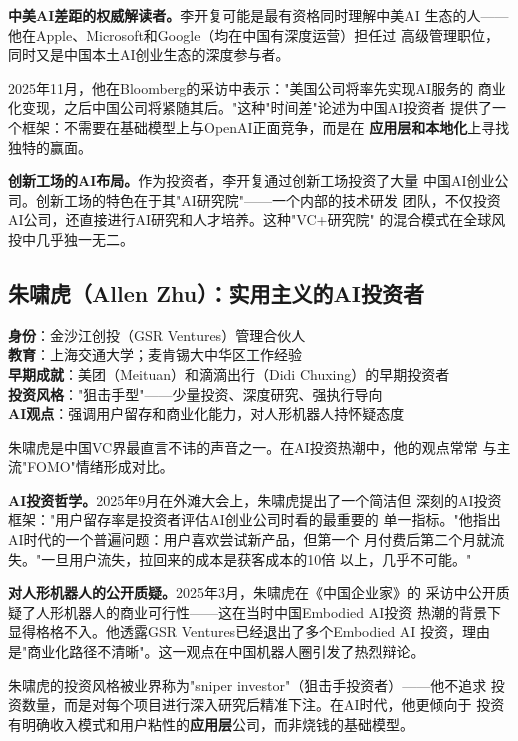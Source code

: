 \textbf{中美AI差距的权威解读者。}李开复可能是最有资格同时理解中美AI
生态的人——他在Apple、Microsoft和Google（均在中国有深度运营）担任过
高级管理职位，同时又是中国本土AI创业生态的深度参与者。

2025年11月，他在Bloomberg的采访中表示："美国公司将率先实现AI服务的
商业化变现，之后中国公司将紧随其后。"这种"时间差"论述为中国AI投资者
提供了一个框架：不需要在基础模型上与OpenAI正面竞争，而是在
\textbf{应用层和本地化}上寻找独特的赢面。

\textbf{创新工场的AI布局。}作为投资者，李开复通过创新工场投资了大量
中国AI创业公司。创新工场的特色在于其"AI研究院"——一个内部的技术研发
团队，不仅投资AI公司，还直接进行AI研究和人才培养。这种"VC+研究院"
的混合模式在全球风投中几乎独一无二。


\subsection{朱啸虎（Allen Zhu）：实用主义的AI投资者}
\label{subsec:inv-zhu}

\begin{corebox}
\textbf{身份}：金沙江创投（GSR Ventures）管理合伙人 \\
\textbf{教育}：上海交通大学；麦肯锡大中华区工作经验 \\
\textbf{早期成就}：美团（Meituan）和滴滴出行（Didi Chuxing）的早期投资者 \\
\textbf{投资风格}："狙击手型"——少量投资、深度研究、强执行导向 \\
\textbf{AI观点}：强调用户留存和商业化能力，对人形机器人持怀疑态度
\end{corebox}

朱啸虎是中国VC界最直言不讳的声音之一。在AI投资热潮中，他的观点常常
与主流"FOMO"情绪形成对比。

\textbf{AI投资哲学。}2025年9月在外滩大会上，朱啸虎提出了一个简洁但
深刻的AI投资框架："用户留存率是投资者评估AI创业公司时看的最重要的
单一指标。"他指出AI时代的一个普遍问题：用户喜欢尝试新产品，但第一个
月付费后第二个月就流失。"一旦用户流失，拉回来的成本是获客成本的10倍
以上，几乎不可能。"

\textbf{对人形机器人的公开质疑。}2025年3月，朱啸虎在《中国企业家》的
采访中公开质疑了人形机器人的商业可行性——这在当时中国Embodied AI投资
热潮的背景下显得格格不入。他透露GSR Ventures已经退出了多个Embodied AI
投资，理由是"商业化路径不清晰"。这一观点在中国机器人圈引发了热烈辩论。

朱啸虎的投资风格被业界称为"sniper investor"（狙击手投资者）——他不追求
投资数量，而是对每个项目进行深入研究后精准下注。在AI时代，他更倾向于
投资有明确收入模式和用户粘性的\textbf{应用层}公司，而非烧钱的基础模型。


